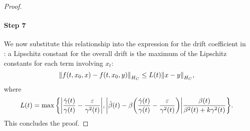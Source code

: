 \begin{proof}
  \paragraph{Step 7} We now substitute this relationship into the expression for the drift coefficient in : a Lipschitz constant for the overall drift is the maximum of the Lipschitz constants for each term involving \(x_{t}\):
  \[
    \norm{f(t, x_{0}, x) - f(t, x_{0}, y)}_{H_{C}} \leq L(t) \norm{x - y}_{H_{C}},
  \]
  where
  \[
    L(t) =  \mathop{\underset{}{\max}}\qty{\abs{\frac{\dot{\gamma}(t)}{\gamma(t)} - \frac{\varepsilon}{\gamma^{2}(t)}}, \abs{\dot{\beta}(t) - \beta\qty(\frac{\dot{\gamma}(t)}{\gamma(t)} - \frac{\varepsilon}{\gamma^{2}(t)})} \frac{\beta(t)}{\beta^{2}(t) + k \gamma^{2}(t)}}.
  \]
  This concludes the proof.%
\end{proof}

